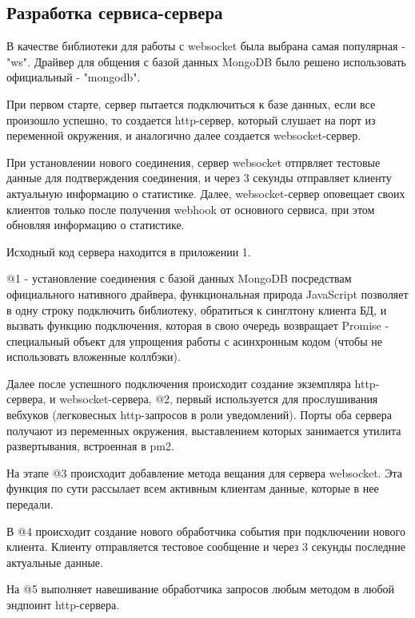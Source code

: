 \documentclass[a4paper, 12pt]{article}
\begin{document}
    \subsection*{Разработка сервиса-сервера}
    В качестве библиотеки для работы с websocket была выбрана самая популярная - "ws". Драйвер для общения с базой
    данных MongoDB было решено использовать официальный - "mongodb".

    При первом старте, сервер пытается подключиться к базе данных, если все произошло успешно, то создается http-сервер,
    который слушает на порт из переменной окружения, и аналогично далее создается websocket-сервер.

    При установлении нового соединения, сервер websocket отпрвляет тестовые данные для подтверждения соединения,
    и через 3 секунды отправляет клиенту актуальную информацию о статистике. Далее, websocket-сервер оповещает
    своих клиентов только после получения webhook от основного сервиса, при этом обновляя информацию о статистике.

    Исходный код сервера находится в приложении 1.

    @1 - установление соединения с базой данных MongoDB посредствам официального нативного драйвера, функциональная природа
    JavaScript позволяет в одну строку подключить библиотеку, обратиться к синглтону клиента БД, и вызвать функцию подключения,
    которая в свою очередь возвращает Promise - специальный объект для упрощения работы с асинхронным кодом (чтобы не
    использовать вложенные коллбэки).

    Далее после успешного подключения происходит создание экземпляра http-сервера, и
    websocket-сервера, @2, первый используется для прослушивания вебхуков (легковесных http-запросов в роли уведомлений).
    Порты оба сервера получают из переменных окружения, выставлением которых занимается утилита развертывания, встроенная в pm2.

    На этапе @3 происходит добавление метода вещания для сервера websocket. Эта функция по сути рассылает всем активным клиентам
    данные, которые в нее передали.

    В @4 происходит создание нового обработчика события при подключении нового клиента. Клиенту отправляется тестовое сообщение
    и через 3 секунды последние актуальные данные.

    На @5 выполняет навешивание обработчика запросов любым методом в любой эндпоинт http-сервера.
\end{document}
